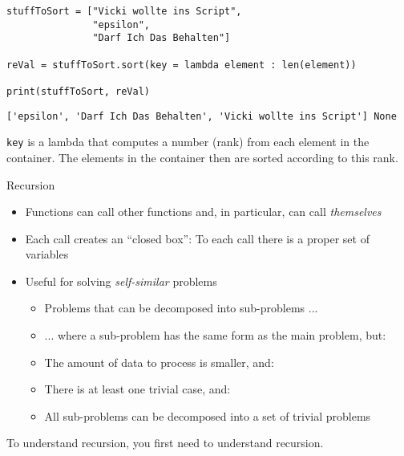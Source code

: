 
\begin{frame}[fragile]
%
\vspace{-5pt}
\begin{codebox}
\begin{verbatim}
stuffToSort = ["Vicki wollte ins Script",
               "epsilon", 
               "Darf Ich Das Behalten"]

reVal = stuffToSort.sort(key = lambda element : len(element))

print(stuffToSort, reVal)
\end{verbatim}
\end{codebox}
%
\vspace{-10pt}
\begin{cmdbox}
\begin{verbatim}
['epsilon', 'Darf Ich Das Behalten', 'Vicki wollte ins Script'] None
\end{verbatim}
\end{cmdbox}
%
\begin{hintbox}
\texttt{key} is a lambda that computes a number (rank) from each element in the container. The elements in the container then are sorted according to this rank.
\end{hintbox}
%
\end{frame}


\begin{frame}{Recursion}
%
\begin{itemize}
\item Functions can call other functions and, in particular, can call \emph{themselves}
\item Each call creates an \enquote{closed box}: To each call there is a proper set of variables
\item Useful for solving \emph{self-similar} problems
	\begin{itemize}
	\item Problems that can be decomposed into sub-problems ...
	\item ... where a sub-problem has the same form as the main problem, but:
	\item The amount of data to process is smaller, and:
	\item There is at least one trivial case, and:
	\item All sub-problems can be decomposed into a set of trivial problems
	\end{itemize}
\end{itemize}
%
\begin{hintbox}
To understand recursion, you first need to understand recursion.
\end{hintbox}
%
\end{frame}

